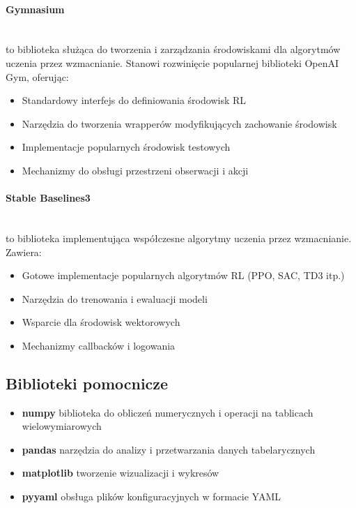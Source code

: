 \paragraph{Gymnasium} \\

to biblioteka służąca do tworzenia i zarządzania środowiskami dla algorytmów uczenia przez wzmacnianie. Stanowi rozwinięcie popularnej biblioteki OpenAI Gym, oferując:

\begin{itemize}
    \item Standardowy interfejs do definiowania środowisk RL
    \item Narzędzia do tworzenia wrapperów modyfikujących zachowanie środowisk
    \item Implementacje popularnych środowisk testowych
    \item Mechanizmy do obsługi przestrzeni obserwacji i akcji
\end{itemize}

\paragraph{Stable Baselines3} \\

to biblioteka implementująca współczesne algorytmy uczenia przez wzmacnianie. Zawiera:

\begin{itemize}
    \item Gotowe implementacje popularnych algorytmów RL (PPO, SAC, TD3 itp.)
    \item Narzędzia do trenowania i ewaluacji modeli
    \item Wsparcie dla środowisk wektorowych
    \item Mechanizmy callbacków i logowania
\end{itemize}


\subsection{Biblioteki pomocnicze}

\begin{itemize}
    \item \textbf{numpy} biblioteka do obliczeń numerycznych i operacji na
    tablicach wielowymiarowych
    \item \textbf{pandas} narzędzia do analizy i przetwarzania danych
    tabelarycznych
    \item \textbf{matplotlib} tworzenie wizualizacji i wykresów
    \item \textbf{pyyaml} obsługa plików konfiguracyjnych w formacie YAML
\end{itemize}

